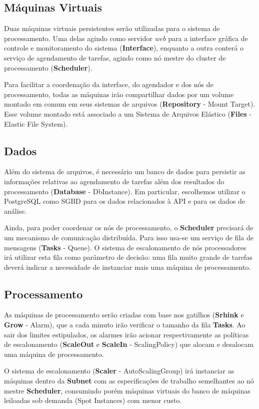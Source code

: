 \documentclass[pfc]{imetex}
\begin{document}
\subsection{Máquinas Virtuais}
Duas máquinas virtuais persistentes serão utilizadas para o sistema de processamento. Uma delas agindo como servidor \textit{web} para a interface gráfica de controle e monitoramento do sistema (\textbf{Interface}), enquanto a outra conterá o serviço de agendamento de tarefas, agindo como nó mestre do cluster de processamento (\textbf{Scheduler}).

Para facilitar a coordenação da interface, do agendador e dos nós de processamento, todas as máquinas irão compartilhar dados por um volume montado em comum em seus sistemas de arquivos (\textbf{Repository} - Mount Target). Esse volume montado está associado a um Sistema de Arquivos Elástico (\textbf{Files} - Elastic File System).

\subsection{Dados}
Além do sistema de arquivos, é necessário um banco de dados para persistir as informações relativas ao agendamento de tarefas além dos resultados do processamento (\textbf{Database} - DbInstance). Em particular, escolhemos utilizar o PostgreSQL como SGBD para os dados relacionados à API e para os dados de análise.

Ainda, para poder coordenar os nós de processamento, o \textbf{Scheduler} precisará de um mecanismo de comunicação distribuída. Para isso usa-se um serviço de fila de mensagens (\textbf{Tasks} - Queue). O sistema de escalonamento de nós processadores irá utilizar esta fila como parâmetro de decisão: uma fila muito grande de tarefas deverá indicar a necessidade de instanciar mais uma máquina de processamento.

\subsection{Processamento}
As máquinas de processamento serão criadas com base nos gatilhos (\textbf{Srhink} e \textbf{Grow} - Alarm), que a cada minuto irão verificar o tamanho da fila \textbf{Tasks}. Ao sair dos limites estipulados, os alarmes irão acionar respectivamente as políticas de escalonamento (\textbf{ScaleOut} e \textbf{ScaleIn} - ScalingPolicy) que alocam e desalocam uma máquina de processamento.

O sistema de escalonamento (\textbf{Scaler} - AutoScalingGroup) irá instanciar as máquinas dentro da \textbf{Subnet} com as especificações de trabalho semelhantes ao nó mestre \textbf{Scheduler}, consumindo porém máquinas virtuais do banco de máquinas leiloadas sob demanda (Spot Instances) com menor custo.
\end{document}
